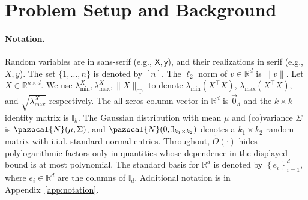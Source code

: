 \documentclass[11pt]{article}
\theoremstyle{definition}
\theoremstyle{plain}
\providecommand{\appendixref}[1]{Appendix~\ref{#1}}
\newcommand{\iid}{i.i.d.}
\newcommand{\reals}{\mathbb{R}}
\providecommand{\brI}{\mathbb{I}}
\newcommand{\Norm}[1]{\left\| #1 \right\|}
\providecommand{\norm}[1]{\Norm{#1}}
\newcommand{\pN}{\pazocal{N}}
\begin{document}
\section{Problem Setup and Background}
\label{s:background}

\paragraph{Notation.} 
Random variables are in sans-serif (e.g., \(\mathsf{X}, \mathsf{y}\)), and their realizations in serif (e.g., \(X, y\)). 
The set \(\{1, \ldots, n\}\) is denoted by \([n]\).
The $\ell_{2}$ norm of \(v \in \reals^{d}\) is \(\|v\|\).
Let \(X \in \reals^{n \times d}\).
We use \(\lambda^{X}_{\min}, \lambda^{X}_{\max}, \|X\|_{\mathrm{op}}\) to denote \(\lambda_{\min}(X^{\top}X)\), \(\lambda_{\max}(X^{\top}X)\), and \(\sqrt{\lambda_{\max}^{X}}\) respectively.
The all-zeros column vector in $\reals^{d}$ is \(\vec{0}_{d}\) and the $k \times k$ identity matrix is $\brI_k$.
The Gaussian distribution with mean \(\mu\) and (co)variance \(\Sigma\) is \(\pN(\mu, \Sigma)\), and 
$\pN(0,\brI_{k_1 \times k_2})$ denotes a \(k_{1} \times k_{2}\) random matrix with \iid{} standard normal entries. Throughout, $\widetilde{O}(\cdot)$ hides polylogarithmic factors only in quantities whose dependence in the displayed bound is at most polynomial. The standard basis for \(\reals^{d}\) is denoted by $\left\{e_i\right\}^{d}_{i=1}$, where $e_i \in \reals^{d}$ are the columns of \(\brI_{d}\). Additional notation is in \appendixref{app:notation}.
\end{document}
